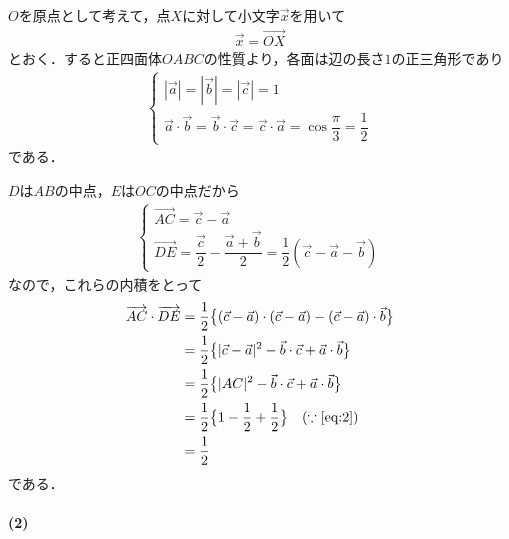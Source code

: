 \documentclass[../../main.tex]{subfiles}
\begin{document}
$O$を原点として考えて，点$X$に対して小文字$\vec{x}$を用いて
\begin{align}
  \vec x=\overrightarrow{OX} \label{eq:1}
\end{align}
とおく．すると正四面体$OABC$の性質より，各面は辺の長さ$1$の正三角形であり
\begin{align}
  \begin{cases}
    |\vec a|=|\vec b|=|\vec c|=1 \\
    \vec a\cdot\vec b=\vec b\cdot\vec c=\vec c\cdot\vec a = \cos\dfrac{\pi}{3} = \dfrac{1}{2}
  \end{cases} \label{eq:2}
\end{align}
である．

$D$は$AB$の中点，$E$は$OC$の中点だから
\begin{align}
  \begin{cases}
    \overrightarrow{AC}=\vec c-\vec a \\
    \overrightarrow{DE}=\dfrac{\vec c}{2}-\dfrac{\vec a+\vec b}{2}=\dfrac{1}{2}(\vec c-\vec a-\vec b)
  \end{cases}
\end{align}
なので，これらの内積をとって
\begin{align}
  \overrightarrow{AC}\cdot\overrightarrow{DE}
  &=\dfrac{1}{2}\bigl\{(\vec c-\vec a)\cdot(\vec c-\vec a)-(\vec c-\vec a)\cdot\vec b\bigr\} \\
  &=\dfrac{1}{2}\bigl\{|\vec c-\vec a|^2-\vec b\cdot\vec c+\vec a\cdot\vec b\bigr\} \\
  &=\dfrac{1}{2}\bigl\{|AC|^2-\vec b\cdot\vec c+\vec a\cdot\vec b\bigr\} \\
  &=\dfrac{1}{2}\bigl\{ 1-\dfrac{1}{2}+\dfrac{1}{2} \bigr\} \quad (\because \text{\cref{eq:2}})\\
  &=\dfrac{1}{2}
\end{align}
である．

\paragraph{(2)}
\end{document}
